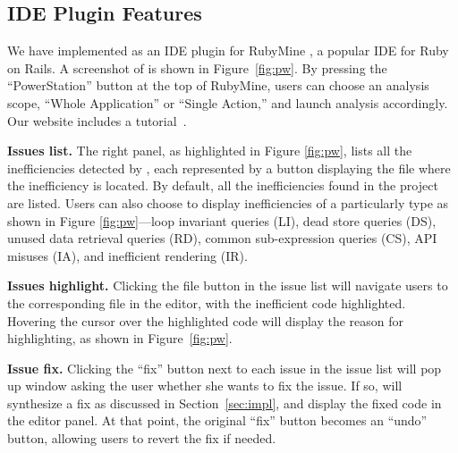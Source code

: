 \label{sec:ui}

\subsection{\Tool IDE Plugin Features}
We have implemented \Tool as an IDE plugin for RubyMine \cite{RubyMine}, a popular IDE
for Ruby on Rails. A screenshot of \Tool is shown in 
Figure~\ref{fig:pw}. By pressing the ``PowerStation'' button 
at the top of RubyMine, users can choose an analysis scope, 
``Whole Application'' or ``Single Action,''
and launch \Tool analysis accordingly. 
Our website includes a tutorial~\cite{powerstation}.

\textbf{Issues list.} The right panel, as highlighted in Figure \ref{fig:pw}, lists all the
inefficiencies detected by \Tool, each represented by a button displaying the file where
the inefficiency is located. 
By default, all the inefficiencies found in the project are listed. %
Users can also choose to display inefficiencies of a particularly type as shown in Figure \ref{fig:pw}---loop invariant queries (LI), dead store queries (DS), unused data retrieval queries (RD), 
common sub-expression queries (CS), API misuses (IA), and inefficient rendering (IR).

\textbf{Issues highlight.} 
Clicking the file button in the issue list will navigate users 
to the corresponding file in the editor, with the inefficient code 
highlighted. Hovering the cursor over the highlighted code will display the reason for highlighting, as shown in Figure~\ref{fig:pw}.

\textbf{Issue fix.} Clicking the ``fix'' button next to each issue in the issue list will 
pop up window asking the user whether she wants \Tool to fix the issue. If so, \Tool will synthesize a fix as discussed in 
Section~\ref{sec:impl}, and display the fixed code in the editor panel. 
At that point, the original ``fix'' button becomes an ``undo'' button, allowing users to revert the fix if needed.

